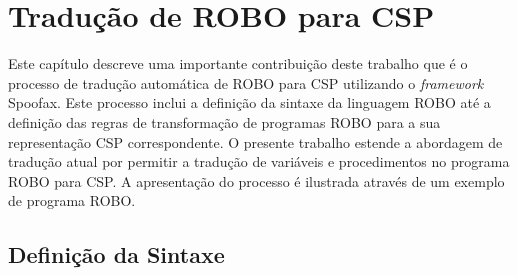 \chapter{Tradução de ROBO para CSP}
\label{chap:cap3}

Este capítulo descreve uma importante contribuição deste trabalho que é o processo de tradução automática de ROBO para CSP utilizando o \textit{framework} Spoofax. Este processo inclui a definição da sintaxe da linguagem ROBO até a definição das regras de transformação de programas ROBO para a sua representação CSP correspondente. O presente trabalho estende a abordagem de tradução atual por permitir a tradução de variáveis e procedimentos no programa ROBO para CSP.  A apresentação do processo é ilustrada através de um exemplo de programa ROBO.


\section{Definição da Sintaxe}

